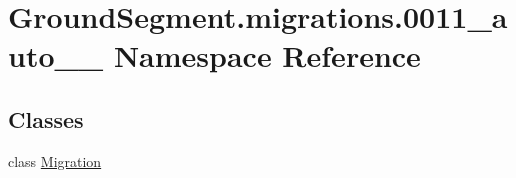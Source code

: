 \hypertarget{namespace_ground_segment_1_1migrations_1_10011__auto__20161127__2019}{}\section{Ground\+Segment.\+migrations.0011\+\_\+auto\+\_\+\_ Namespace Reference}
\label{namespace_ground_segment_1_1migrations_1_10011__auto__20161127__2019}
\subsection*{Classes}
\begin{DoxyCompactItemize}
\item 
class \hyperlink{class_ground_segment_1_1migrations_1_10011__auto__20161127__2019_1_1_migration}{Migration}
\end{DoxyCompactItemize}
